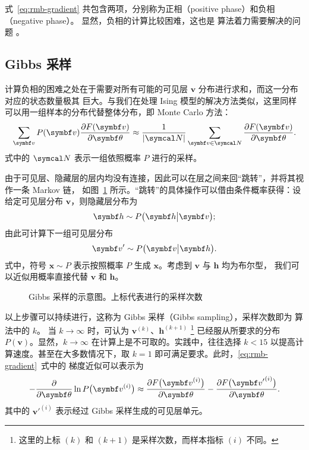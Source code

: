 式~\eqref{eq:rmb-gradient} 共包含两项，分别称为正相（positive phase）和负相（negative phase）。
显然，负相的计算比较困难，这也是 \CDk{} 算法着力需要解决的问题 \cite{rbmonline}。

\subsection{Gibbs 采样}

计算负相的困难之处在于需要对所有可能的可见层 $\bm{v}$ 分布进行求和，而这一分布对应的状态数量极其
巨大。与我们在处理 Ising 模型的解决方法类似，这里同样可以用一组样本的分布代替整体分布，即 Monte
Carlo 方法：
\begin{equation}
  \sum_{\bm{v}} P(\bm{v}) \pdv{F(\bm{v})}{\bm{\theta}}
  \approx \frac{1}{\abs{\domN}} \sum_{\bm{v}\in\domN} \pdv{F(\bm{v})}{\bm{\theta}}.
\end{equation}
式中的 $\domN$ 表示一组依照概率 $P$ 进行的采样。

由于可见层、隐藏层的层内均没有连接，因此可以在层之间来回“跳转”，并将其视作一条 Markov 链，
如图~\ref{fig:gibbs-sampling} 所示。“跳转”的具体操作可以借由条件概率获得：设给定可见层分布
$\bm{v}$，则隐藏层分布为
\begin{equation}
  \label{eq:hidden-layer-dist}
  \bm{h} \sim P\qty\big(\bm{h}\big|\bm{v});
\end{equation}
由此可计算下一组可见层分布
\begin{equation}
  \label{eq:visible-layer-dist}
  \bm{v}' \sim P\qty\big(\bm{v}\big|\bm{h}).
\end{equation}
式中，符号 $\bm{x}\sim P$ 表示按照概率 $P$ 生成 $\bm{x}$。考虑到 $\bm{v}$ 与 $\bm{h}$ 均为布尔型，
我们可以近似用概率直接代替 $\bm{v}$ 和 $\bm{h}$。

\begin{figure}[htb]
  \centering
  \caption{Gibbs 采样的示意图。上标代表进行的采样次数}
  \label{fig:gibbs-sampling}
\end{figure}

以上步骤可以持续进行，这称为 Gibbs 采样（Gibbs sampling），采样次数即为 \CDk{} 算法中的 $k$。
当 $k\to\infty$ 时，可认为 $\bm{v}^{(k)}$、$\bm{h}^{(k+1)}$
\footnote{这里的上标 $(k)$ 和 $(k+1)$ 是采样次数，而样本指标 $(i)$ 不同。}
已经服从所要求的分布 $P(\bm{v})$。显然，$k\to\infty$ 在计算上是不可取的。实践中，往往选择 $k<15$
以提高计算速度。甚至在大多数情况下，取 $k=1$ 即可满足要求。此时，\eqref{eq:rmb-gradient}~式中的
梯度近似可以表示为 \cite{rbmonline,hinton2012practical,hinton2002training}
\begin{equation}
  \label{eq:rmb-gradient-approx}
  - \pdv{\bm{\theta}} \ln P\qty\big(\bm{v}^{(i)})
  \approx \pdv{F\qty\big(\bm{v}^{(i)})}{\bm{\theta}}
        - \pdv{F\qty\big({\bm{v}'}^{(i)})}{\bm{\theta}}.
\end{equation}
其中的 ${\bm{v}'}^{(i)}$ 表示经过 Gibbs 采样生成的可见层单元。

